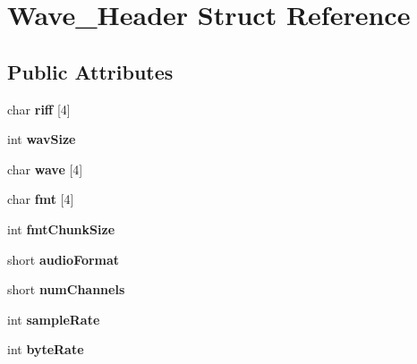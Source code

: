 \hypertarget{structWave__Header}{}\section{Wave\+\_\+\+Header Struct Reference}
\label{structWave__Header}
\subsection*{Public Attributes}
\begin{DoxyCompactItemize}
\item 
\mbox{\label{structWave__Header_ac90ed5a284cbf30b3f69ea082de3a0c6}} 
char {\bfseries riff} \mbox{[}4\mbox{]}
\item 
\mbox{\label{structWave__Header_a6928c2d8b8904339ebb788eb8290f142}} 
int {\bfseries wav\+Size}
\item 
\mbox{\label{structWave__Header_a0619c4f802e42c1f0df93f77eab026b3}} 
char {\bfseries wave} \mbox{[}4\mbox{]}
\item 
\mbox{\label{structWave__Header_a14d810235149a0b8bfab223852e1d414}} 
char {\bfseries fmt} \mbox{[}4\mbox{]}
\item 
\mbox{\label{structWave__Header_a6b4c3112066ec18881997ca2f42b9c53}} 
int {\bfseries fmt\+Chunk\+Size}
\item 
\mbox{\label{structWave__Header_a78581f9b4fa8ccd937260f6acd1805e4}} 
short {\bfseries audio\+Format}
\item 
\mbox{\label{structWave__Header_a06db23d3c3ae3e20dca44ec8e1b62210}} 
short {\bfseries num\+Channels}
\item 
\mbox{\label{structWave__Header_ab5fb0a7055f8ea82df946d215bc803ee}} 
int {\bfseries sample\+Rate}
\item 
\mbox{\label{structWave__Header_ad060843c06006ec4158afc8dccea9fc3}} 
int {\bfseries byte\+Rate}
\item 
\mbox{\label{structWave__Header_aa9440351df7a8f57a5536fea94958c56}} 

\end{DoxyCompactItemize}

